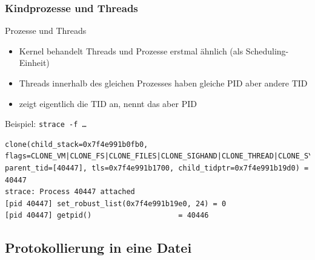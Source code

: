 \begin{frame}[fragile]
  \frametitle{Kindprozesse und Threads}

  \begin{block}{Prozesse und Threads}
    \begin{itemize}
      \item Kernel behandelt Threads und Prozesse erstmal ähnlich (als Scheduling-Einheit)
      \item Threads innerhalb des gleichen Prozesses haben gleiche PID aber andere TID
      \item \strace{} zeigt eigentlich die TID an, nennt das aber PID
     \end{itemize}
  \end{block}

  \begin{exampleblock}{Beispiel: \texttt{strace -f \ldots}}
    \begin{lstlisting}
clone(child_stack=0x7f4e991b0fb0, flags=CLONE_VM|CLONE_FS|CLONE_FILES|CLONE_SIGHAND|CLONE_THREAD|CLONE_SYSVSEM|CLONE_SETTLS|CLONE_PARENT_SETTID|CLONE_CHILD_CLEARTID, parent_tid=[40447], tls=0x7f4e991b1700, child_tidptr=0x7f4e991b19d0) = 40447
strace: Process 40447 attached
[pid 40447] set_robust_list(0x7f4e991b19e0, 24) = 0
[pid 40447] getpid()                    = 40446
          \end{lstlisting}
    \end{exampleblock}
\end{frame}

\subsection{Protokollierung in eine Datei}

